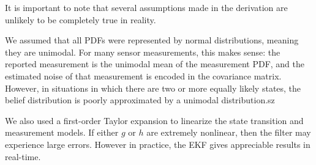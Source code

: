 It is important to note that several assumptions made in the derivation are unlikely to be completely true in reality.

We assumed that all PDFs were represented by normal distributions, meaning they are unimodal. For many sensor measurements, this makes sense: the reported measurement is the unimodal mean of the measurement PDF, and the estimated noise of that measurement is encoded in the covariance matrix. However, in situations in which there are two or more equally likely states, the belief distribution is poorly approximated by a unimodal distribution.sz

We also used a first-order Taylor expansion to linearize the state transition and measurement models. If either \(g\) or \(h\) are extremely nonlinear, then the filter may experience large errors. However in practice, the EKF gives appreciable results in real-time. 





